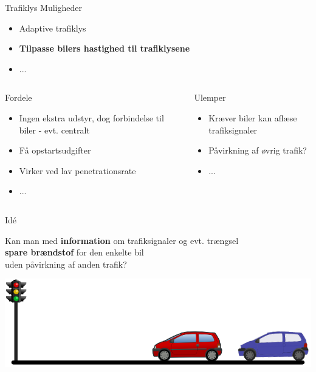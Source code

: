 \begin{frame}{Trafiklys}
Muligheder
\begin{itemize}
\item Adaptive trafiklys
\item \textbf{Tilpasse bilers hastighed til trafiklysene}
\item ...
\end{itemize}


\begin{center}
\begin{columns}
\begin{column}{0.5\textwidth}
Fordele
\begin{itemize}
\item Ingen ekstra udstyr, dog forbindelse til biler - evt. centralt
\item Få opstartsudgifter 
\item Virker ved lav penetrationsrate
\item ...
\end{itemize}
\end{column}

\begin{column}{0.5\textwidth}
Ulemper
\begin{itemize}
\item Kræver biler kan aflæse trafiksignaler
\item Påvirkning af øvrig trafik?
\item ...
\end{itemize}
\end{column}
\end{columns}
\end{center}
\end{frame}

\begin{frame}{Idé}
\begin{center}
Kan man med \textbf{information} om trafiksignaler og evt. trængsel\\\textbf{spare brændstof} for den enkelte bil\\uden påvirkning af anden trafik?
\end{center}
\includegraphics[width=1\textwidth]{images/figure.png}
\end{frame}



